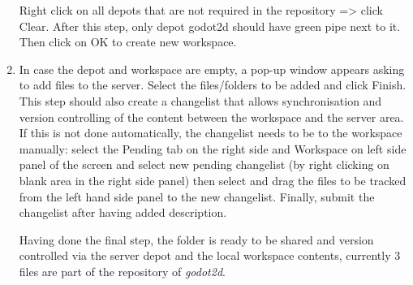 \begin{enumerate}
\begin{figure}[H]
          \label{fig:new-workspace}
    \end{figure}
    Right click on all depots that are not required in the repository => click Clear. After this step, only depot godot2d
    should have green pipe next to it. Then click on OK to create new workspace.
    \item In case the depot and workspace are empty, a pop-up window appears asking to add files to the server. Select
    the files/folders to be added and click Finish. This step should also create a changelist that allows synchronisation
    and version controlling of the content between the workspace and the server area. If this is not done automatically,
    the changelist needs to be to the workspace manually: select the Pending tab on the right side and Workspace on left
    side panel of the screen and select new pending changelist (by right clicking on blank area in the right side panel)
    then select and drag the files to be tracked from the left hand side panel to the new changelist. Finally, submit the
    changelist after having added description.

    Having done the final step, the folder is ready to be shared and version controlled via the server depot and the 
    local workspace contents, currently 3 files are part of the repository of \textit{godot2d}.
\end{enumerate}
